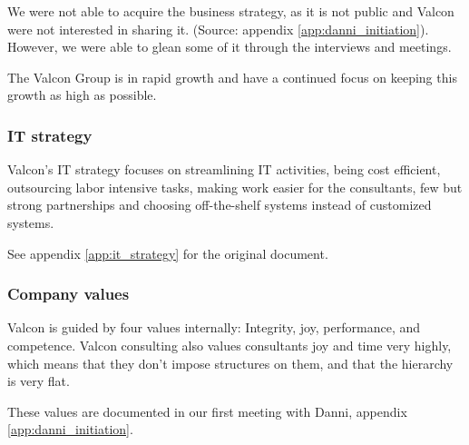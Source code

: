 We were not able to acquire the business strategy, as it is not public and Valcon were not interested in sharing it. (Source: appendix \ref{app:danni_initiation}).
However, we were able to glean some of it through the interviews and meetings.

The Valcon Group is in rapid growth and have a continued focus on keeping this growth as high as possible.

\subsubsection{IT strategy}
Valcon's IT strategy focuses on streamlining IT activities, being cost efficient, outsourcing labor intensive tasks, making work easier for the consultants, few but strong partnerships and choosing off-the-shelf systems instead of customized systems.

See appendix \ref{app:it_strategy} for the original document.

\subsubsection{Company values}
Valcon is guided by four values internally: Integrity, joy, performance, and competence.
Valcon consulting also values consultants joy and time very highly, which means that they don't impose structures on them, and that the hierarchy is very flat.

These values are documented in our first meeting with Danni, appendix \ref{app:danni_initiation}.